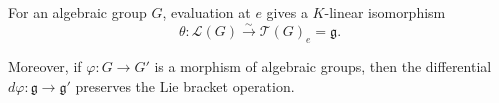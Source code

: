 For an algebraic group $G$, evaluation at $e$ gives a $K$-linear isomorphism
$$\theta: \mathcal{L}(G) \xrightarrow{\sim} \mathcal{T}(G)_e = \mathfrak{g}.$$

Moreover, if $\varphi: G \rightarrow G'$ is a morphism of algebraic groups, then the differential $d\varphi: \mathfrak{g} \rightarrow \mathfrak{g}'$ preserves the Lie bracket operation.
